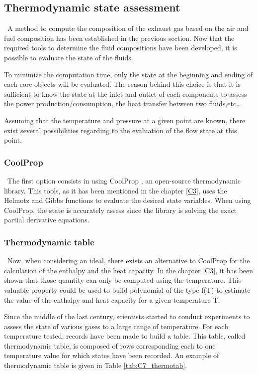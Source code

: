 \subsection{Thermodynamic state assessment}\label{C7: thermo_state}
\quad\ A method to compute the composition of the exhaust gas based on the air and fuel composition has been established in the previous section. Now that the required tools to determine the fluid compositions have been developed, it is possible to evaluate the state of the fluids. 

To minimize the computation time, only the state at the beginning and ending of each core objects will be evaluated. The reason behind this choice is that it is sufficient to know the state at the inlet and outlet of each components to assess the power production/consumption, the heat transfer between two fluids,etc\dots

Assuming that the temperature and pressure at a given point are known, there exist several possibilities regarding to the evaluation of the flow state at this point. 

\subsubsection{CoolProp}
\quad\ The first option consists in using CoolProp \cite{Bell2014}, an open-source thermodynamic library. This tools, as it has been mentioned in the chapter \ref{C3}, uses the Helmotz and Gibbs functions to evaluate the desired state variables. When using CoolProp, the state is accurately assess since the library is solving the exact partial derivative equations. 

\subsubsection{Thermodynamic table}
\quad\ Now, when considering an ideal, there exists an alternative to CoolProp for the calculation of the enthalpy and the heat capacity. In the chapter \ref{C3}, it has been shown that those quantity can only be computed using the temperature. This valuable property could be used to build polynomial of the type f(T) to estimate the value of the enthalpy and heat capacity for a given temperature T. 

Since the middle of the last century, scientists started to conduct experiments to assess the state of various gases to a large range of temperature. For each temperature tested, records have been made to build a table. This table, called thermodynamic table, is composed of rows corresponding each to one temperature value for which states have been recorded. 
An example of thermodynamic table is given in Table \ref{tab:C7_thermotab}.

